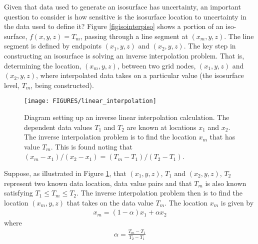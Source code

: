 \documentclass[11pt,twoside]{book}
\newcommand{\figoptions}{hbp}
\begin{document}
Given that data used to generate an isosurface has uncertainty, an
important question to consider is how sensitive is the isosurface
location to uncertainty in the data used to define it? Figure
\ref{figisointerpiso} shows a portion of an iso-surface,
$f(x,y,z)=T_m$, passing through a line segment at $(x_m,y,z)$.
The line segment is defined by endpoints $(x_1,y,z)$ and
$(x_2,y,z)$.  The key step in constructing an isosurface is
solving an inverse interpolation problem.   That is, determining
the location, $(x_m,y,z)$, between two grid nodes, $(x_1,y,z)$ and
$(x_2,y,z)$, where interpolated data takes on a particular value
(the isosurface level, $T_m$, being constructed).

\begin{figure}[\figoptions]
\begin{center}
\texttt{[image: FIGURES/linear\_interpolation]}
\end{center}
\caption[Diagram setting up an inverse linear interpolation
calculation]{Diagram setting up an inverse linear interpolation
calculation.  The dependent data values $T_1$ and $T_2$ are known
at locations $x_1$ and $x_2$. The inverse interpolation problem is
to find the location $x_m$ that has value $T_m$.
 This is found noting that $(x_m-x_1)/(x_2-x_1)=(T_m-T_1)/(T_2-T_1)$.
  }
\label{figisointerp}%
\end{figure}

Suppose, as illustrated in Figure \ref{figisointerp}, that
$(x_1,y,z)$, $T_1$ and $(x_2,y,z)$, $T_2$ represent two known data
location, data value pairs and that $T_m$ is also known satisfying
$T_1\le T_m \le T_2$.  The inverse interpolation problem then is
to find the location $(x_m,y,z)$ that takes on the data value
$T_m$.  The location $x_m$ is given by
\begin{eqnarray*}
x_m=(1-\alpha)x_1+\alpha x_2
\end{eqnarray*}
where
\begin{eqnarray*}
\alpha=\frac{T_m-T_1}{T_2-T_1}
\end{eqnarray*}
\end{document}
